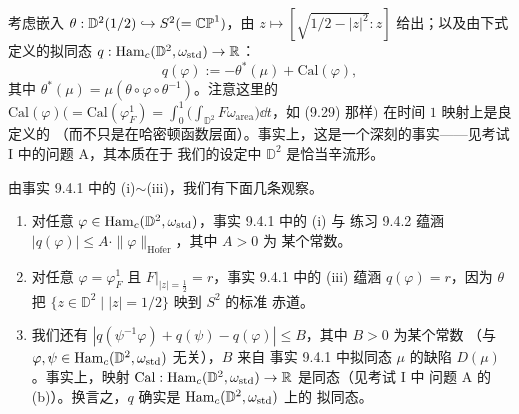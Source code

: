 \begin{wproof}
考虑嵌入 $\theta:\mathbb{D}^2(1/2)\hookrightarrow S^2(=\mathbb{CP}^1)$，由
$z\mapsto[\sqrt{1/2-|z|^2}:z]$ 给出；以及由下式定义的拟同态
$q:\operatorname{Ham}_c(\mathbb{D}^2,\omega_{\mathrm{std}})\to\mathbb{R}$：
\begin{equation}
  q(\varphi):=-\theta^*(\mu)+\mathrm{Cal}(\varphi),
  \tag{9.31}
\end{equation}
其中 $\theta^*(\mu)=\mu(\theta\circ\varphi\circ\theta^{-1})$。注意这里的
$\mathrm{Cal}(\varphi)\Big(=\mathrm{Cal}(\varphi_F^1)=\int_0^1\big(\int_{\mathbb{D}^2}
F\omega_{\mathrm{area}}\big)\dd t$，如 (9.29) 那样$\Big)$ 在时间 $1$ 映射上是良定义的
（而不只是在哈密顿函数层面）。事实上，这是一个深刻的事实——见考试 I 中的问题 A，其本质在于
我们的设定中 $\mathbb{D}^2$ 是恰当辛流形。

由事实 9.4.1 中的 (i)$\sim$(iii)，我们有下面几条观察。

\begin{enumerate}[label=(\alph*)]
  \item 对任意 $\varphi\in\operatorname{Ham}_c(\mathbb{D}^2,\omega_{\mathrm{std}})$，事实 9.4.1 中的 (i) 与
        练习 9.4.2 蕴涵 $|q(\varphi)|\le A\cdot\|\varphi\|_{\mathrm{Hofer}}$，其中 $A>0$ 为
        某个常数。
  \item 对任意 $\varphi=\varphi_F^1$ 且 $F|_{|z|=\frac12}=r$，事实 9.4.1 中的 (iii) 蕴涵
        $q(\varphi)=r$，因为 $\theta$ 把 $\{z\in\mathbb{D}^2\mid|z|=1/2\}$ 映到 $S^2$ 的标准
        赤道。
  \item 我们还有 $|q(\psi^{-1}\varphi)+q(\psi)-q(\varphi)|\le B$，其中 $B>0$ 为某个常数
        （与 $\varphi,\psi\in\operatorname{Ham}_c(\mathbb{D}^2,\omega_{\mathrm{std}})$ 无关），$B$ 来自
        事实 9.4.1 中拟同态 $\mu$ 的缺陷 $D(\mu)$。事实上，映射
        $\mathrm{Cal}:\operatorname{Ham}_c(\mathbb{D}^2,\omega_{\mathrm{std}})\to\mathbb{R}$ 是同态（见考试 I 中
        问题 A 的 (b)）。换言之，$q$ 确实是 $\operatorname{Ham}_c(\mathbb{D}^2,\omega_{\mathrm{std}})$ 上的
        拟同态。
\end{enumerate}


\end{wproof}
